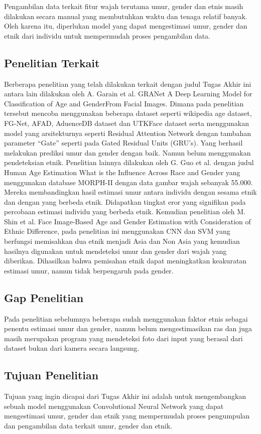 Pengambilan data terkait fitur wajah terutama umur, gender dan etnis masih dilakukan secara manual yang membutuhkan waktu dan tenaga relatif banyak. Oleh karena itu, diperlukan model yang dapat mengestimasi umur, gender dan etnik dari individu untuk mempermudah proses pengambilan data.

\subsection{Penelitian Terkait}

Berberapa penelitian yang telah dilakukan terkait dengan judul Tugas Akhir ini antara lain dilakukan oleh A. Garain et al. GRANet A Deep Learning Model for Classification of Age and GenderFrom Facial Images. Dimana pada penelitian tersebut mencoba menggunakan beberapa dataset seperti wikipedia age dataset, FG-Net, AFAD, AduenceDB dataset dan UTKFace dataset serta menggunakan model yang arsitekturnya seperti Residual Attention Network dengan tambahan parameter “Gate” seperti pada Gated Residual Units (GRU’s). Yang berhasil melakukan prediksi umur dan gender dengan baik. Namun belum menggunakan pendeteksian etnik. Penelitian lainnya dilakukan oleh G. Guo et al. dengan judul Human Age Estimation What is the Influence Across Race and Gender yang menggunakan database MORPH-II dengan data gambar wajah sebanyak 55.000. Mereka membandingkan hasil estimasi umur antara individu dengan sesama etnik dan dengan yang berbeda etnik. Didapatkan tingkat eror yang signifikan pada percobaan estimasi individu  yang  berbeda etnik. Kemudian penelitian oleh M. Shin et al. Face Image-Based Age and Gender Estimation with Consideration of Ethnic Difference, pada penelitian ini menggunakan CNN dan SVM yang berfungsi memisahkan dua etnik menjadi Asia dan Non Asia yang kemudian hasilnya digunakan untuk mendeteksi umur dan gender dari wajah yang diberikan. Dihasilkan bahwa pemisahan etnik dapat meningkatkan keakuratan estimasi umur, namun tidak berpengaruh pada gender.

\subsection{Gap Penelitian}
Pada penelitian sebelumnya beberapa sudah menggunakan faktor etnis sebagai penentu estimasi umur dan gender, namun belum mengestimasikan ras dan juga masih merupakan program yang mendeteksi foto dari input yang berasal dari dataset bukan dari kamera secara langsung.

\subsection{Tujuan Penelitian}

Tujuan yang ingin dicapai dari Tugas Akhir ini adalah untuk mengembangkan sebuah model menggunakan Convolutional Neural Network yang dapat mengestimasi umur, gender dan etnik yang mempermudah proses pengumpulan dan pengambilan data terkait umur, gender dan etnik.